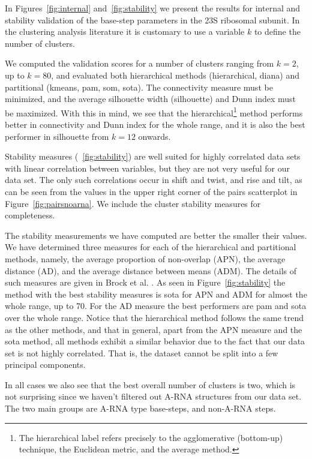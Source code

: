 In  Figures~\ref{fig:internal} and~\ref{fig:stability} we  present the
results  for  internal  and  stability  validation  of  the  base-step
parameters in the 23S ribosomal subunit.  In the clustering analysis
literature it is customary to use  a variable $k$ to define the number
of clusters.

We computed  the validation  scores for a  number of  clusters ranging
from  $k=2$, up  to $k=80$,  and evaluated  both  hierarchical methods
(hierarchical, diana)  and partitional (kmeans, pam,  som, sota).  The
connectivity  measure must  be minimized,  and the  average silhouette
width (silhouette)  and Dunn  index must be  maximized.  With  this in
mind,  we see  that the  hierarchical\footnote{The  hierarchical label
  refers  precisely to  the agglomerative  (bottom-up)  technique, the
  Euclidean metric, and the average method.} method performs better in
connectivity and  Dunn index for the  whole range, and it  is also the
best performer in silhouette from $k=12$ onwards.

Stability measures  (~\ref{fig:stability}) are well  suited for highly
correlated data  sets with  linear correlation between  variables, but
they are not very useful for our data set.  The only such correlations
occur in shift and  twist, and rise and tilt, as can  be seen from the
values  in  the  upper  right  corner  of  the  pairs  scatterplot  in
Figure~\ref{fig:pairsnoarna}.    We  include  the   cluster  stability
measures for completeness.


The  stability measurements we  have computed  are better  the smaller
their  values. We  have  determined  three measures  for  each of  the
hierarchical and  partitional methods, namely,  the average proportion
of  non-overlap (APN),  the  average distance  (AD),  and the  average
distance between means (ADM).  The  details of such measures are given
in     Brock    et    al.      \cite{brock2008}.     As     seen    in
Figure~\ref{fig:stability} the method with the best stability measures
is sota for APN and ADM for almost the whole range, up to 70.  For the
AD measure the best performers are  pam and sota over the whole range.
Notice  that the  hierarchical method  follows the  same trend  as the
other methods, and that in general, apart from the APN measure and the
sota method,  all methods exhibit a  similar behavior due  to the fact
that  our data  set is  not highly  correlated. That  is,  the dataset
cannot be split into a few principal components.

In all cases  we also see that the best overall  number of clusters is
two,  which is  not surprising  since  we haven't  filtered out  A-RNA
structures  from our  data set.  The two  main groups  are  A-RNA type
base-steps, and non-A-RNA steps.

